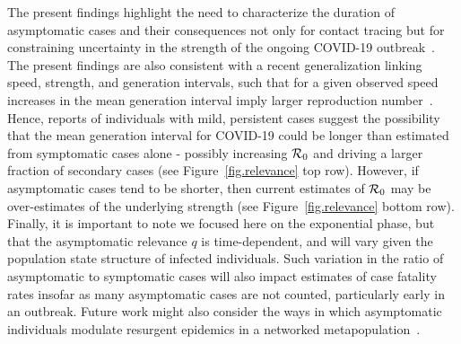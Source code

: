 The present findings highlight the need to characterize
the duration of asymptomatic cases and their consequences
not only for contact tracing but for constraining
uncertainty in the strength of the ongoing COVID-19 outbreak~\citep{park_preprint}.
The present findings are also consistent with
a recent generalization linking speed, strength, and
generation intervals, such that
for a given observed speed
increases in the mean generation interval imply
larger reproduction number~\citep{park_2019practical}. Hence, reports of individuals
with mild, persistent cases 
suggest the possibility that the mean generation interval for COVID-19
could be longer than estimated from symptomatic cases alone - possibly
increasing ${\cal{R}}_0$ and driving a larger fraction of secondary cases
(see Figure~\ref{fig.relevance} top row).
However, if asymptomatic cases tend to be shorter, then
current estimates of ${\cal{R}}_0$ may be over-estimates of the
underlying strength (see Figure~\ref{fig.relevance} bottom row).
Finally, it is important to note we focused here on the exponential
phase, but that the asymptomatic relevance $q$ is time-dependent, and will
vary given the population state structure of infected individuals.  Such
variation in the ratio of asymptomatic to symptomatic cases
will also impact estimates of case fatality rates insofar
as many asymptomatic cases are not counted, particularly early in an outbreak.
Future work might also consider the ways in which asymptomatic individuals
modulate resurgent epidemics in a networked metapopulation~\citep{watts_pnas2005}.

